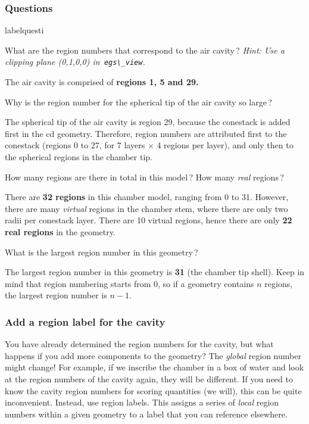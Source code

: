 \documentclass[12pt,twoside]{article}
\makeatletter
\renewcommand\thequesti         {\@arabic\c@questi}
\newenvironment{question}{
    \bfseries
    \edef\@questictr{questi}
    \expandafter
    \list \csname label\@questictr\endcsname {
        \usecounter\@questictr\def\makelabel##1{\hss\llap{##1}}
        \savebox{\questbox}             {\thequesti}
        \setlength\labelsep             {0.6em}
        \setlength\labelwidth           {\wd\questbox}
        \setlength\leftmargini          {\labelwidth}
        \addtolength{\leftmargini}      {\labelsep}
        \addtolength{\leftmargini}      {0.2em}
        \leftmargin\leftmargini
        \setlength\topsep               {1em}
        \setlength\itemsep              {1.2em}
        \setlength\parsep               {0.5em}
    }
}{\normalfont\endlist}
\newenvironment{answer}{\normalfont}{\relax}
\makeatother
\begin{document}
\subsubsection{Questions}

\begin{question}

\item What are the region numbers that correspond to the air cavity\,?
\textit{Hint: Use a clipping plane (0,1,0,0) in \,\Verb|egs\_view|.}

\begin{answer}
The air cavity is comprised of \textbf{regions 1, 5 and 29.}
\end{answer}

\item Why is the region number for the spherical tip of the air cavity so large\,?

\begin{answer}
The spherical tip of the air cavity is region 29, because the conestack is
added first in the cd geometry. Therefore, region numbers are attributed
first to the conestack (regions 0 to 27, for 7 layers $\times$ 4 regions per
layer), and only then to the spherical regions in the chamber tip.
\end{answer}

\item How many regions are there in total in this model\,? How
many \textit{real} regions\,?

\begin{answer}
There are \textbf{32 regions} in this chamber model, ranging from 0 to 31.
However, there are many \textit{virtual} regions in the chamber stem, where
there are only two radii per conestack layer. There are 10 virtual regions,
hence there are only \textbf{22 real regions} in the geometry.
\end{answer}

\item What is the largest region number in this geometry\,?

\begin{answer}
The largest region number in this geometry is \textbf{31} (the chamber tip
shell). Keep in mind that region numbering starts from 0, so if a geometry
contains $n$ regions, the largest region number is $n-1$.
\end{answer}

\end{question}

\subsubsection{Add a region label for the cavity}
You have already determined the region numbers for the cavity, but what happens
if you add more components to the geometry? The \textit{global} region number might
change! For example, if we inscribe the chamber in a box of water and look
at the region numbers of the cavity again, they will be different. If you need
to know the cavity region numbers for scoring quantities (we will), this can
be quite inconvenient. Instead, use region labels. This assigns a series
of \textit{local} region numbers within a given geometry to a label that you can reference
elsewhere.
\end{document}
